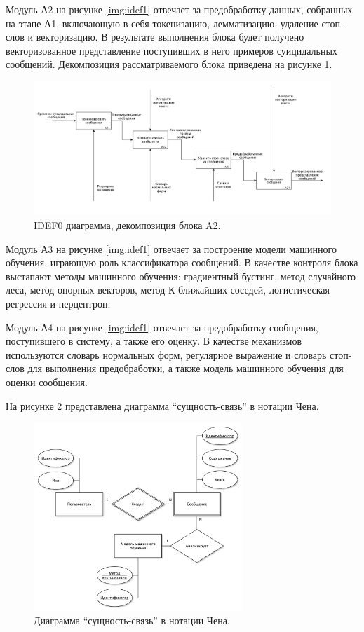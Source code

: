 Модуль А2 на рисунке \ref{img:idef1} отвечает за предобработку данных, собранных на этапе А1, включающую в себя токенизацию, лемматизацию, удаление стоп-слов и векторизацию.
В результате выполнения блока будет получено векторизованное представление поступивших в него примеров суицидальных сообщений. 
Декомпозиция рассматриваемого блока приведена на рисунке \ref{img:idef21}.

\begin{figure}[H]
	\centering
	\includegraphics[width=\textwidth]{inc/A21.pdf}
	\caption{ IDEF0 диаграмма, декомпозиция блока A2. }
	\label{img:idef21}
\end{figure}

Модуль А3 на рисунке \ref{img:idef1} отвечает за построение модели машинного обучения, играющую роль классификатора сообщений. 
В качестве контроля блока выстапают методы машинного обучения: градиентный бустинг, метод случайного леса, метод опорных векторов, метод К-ближайших соседей, логистическая регрессия и перцептрон.

Модуль А4 на рисунке \ref{img:idef1} отвечает за предобработку сообщения, поступившего в систему, а также его оценку. В качестве механизмов используются словарь нормальных форм, регулярное выражение и словарь стоп-слов для выполнения предобработки, а также модель машинного обучения для оценки сообщения.

На рисунке \ref{img:er} представлена диаграмма ``сущность-связь'' в нотации Чена.

\begin{figure}[H]
	\centering
	\includegraphics[width=0.7\textwidth]{inc/er.pdf}
	\caption{ Диаграмма ``сущность-связь'' в нотации Чена. }
	\label{img:er}
\end{figure}

